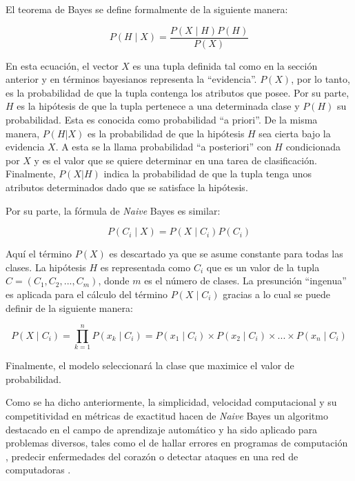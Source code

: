 El teorema de Bayes se define formalmente de la siguiente manera:

\begin{equation}
   P(H \mid X) = \frac{P(X \mid H) P(H)}{P(X)}
\end{equation}

En esta ecuación, el vector $X$ es una tupla definida tal como en la sección
anterior y en términos bayesianos representa la “evidencia”. $P(X)$, por lo
tanto, es la probabilidad de que la tupla contenga los atributos que posee. Por
su parte, $H$ es la hipótesis de que la tupla pertenece a una determinada clase
y $P(H)$ su probabilidad. Esta es conocida como probabilidad “a priori”. De la
misma manera, $P(H|X)$ es la probabilidad de que la hipótesis $H$ sea cierta
bajo la evidencia $X$. A esta se la llama probabilidad “a posteriori” con $H$
condicionada por $X$ y es el valor que se quiere determinar en una tarea de
clasificación.  Finalmente, $P(X|H)$ indica la probabilidad de que la tupla tenga
unos atributos determinados dado que se satisface la hipótesis.

Por su parte, la fórmula de \textit{Naive} Bayes es similar:

\begin{equation}
   P(C_{i} \mid X) = P(X \mid C_{i}) P(C_{i})
\end{equation}

Aquí el término $P(X)$ es descartado ya que se asume constante para todas las
clases. La hipótesis $H$ es representada como $C_{i}$ que es un valor de la
tupla $C=(C_{1},C_{2},...,C_{m})$, donde $m$ es el número de clases. La
presunción “ingenua” es aplicada para el cálculo del término $P(X \mid C_{i})$
gracias a lo cual se puede definir de la siguiente manera:

\begin{equation} 
   P(X \mid C_{i}) = \prod\limits_{k=1}^n{P(x_{k} \mid C_{i})} =
   P(x_{1} \mid C_{i}) \times 
   P(x_{2} \mid C_{i}) \times ... \times 
   P(x_{n} \mid C_{i})   
\end{equation}

Finalmente, el modelo seleccionará la clase que maximice el valor de
probabilidad.  

Como se ha dicho anteriormente, la simplicidad, velocidad computacional y su
competitividad en métricas de exactitud hacen de \textit{Naive} Bayes un
algoritmo destacado en el campo de aprendizaje automático
\cite{wickramasinghe_naive_2020} y ha sido aplicado para problemas diversos,
tales como el de hallar errores en programas de computación
\cite{arar_feature_2017}, predecir enfermedades del corazón
\cite{dulhare_prediction_2018} o detectar ataques en una red de computadoras
\cite{kalutarage_detecting_2015}.


